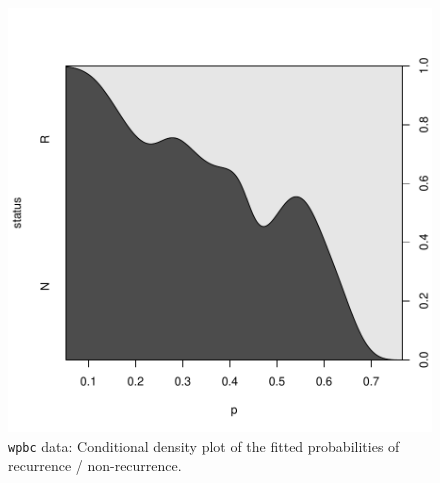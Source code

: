 \documentclass{article}
\newcommand{\Robject}[1]{\texttt{#1}}
\begin{document}
\begin{figure}
\begin{center}
\includegraphics{figures/BH-wpbc-glmboost-prob-plot}
\caption{\Robject{wpbc} data: Conditional density plot of the fitted 
         probabilities of recurrence / non-recurrence. \label{wpbc-glmboost-prob-plot}}
\end{center}
\end{figure}
\end{document}
